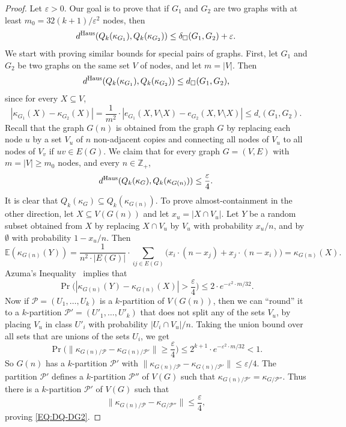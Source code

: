 \documentclass[10pt]{article}
\theoremstyle{plain}
\theoremstyle{definition}
\newcommand{\bbE}{\mathbb{E}}
\newcommand{\bbZ}{\mathbb{Z}}
\newcommand{\PP}{\mathcal{P}}
\newcommand{\eps}{\varepsilon}
\newcommand{\Haus}{{\text{\rm Haus}}}
\begin{document}
\begin{proof}
Let $\eps>0$. Our goal is to prove that if $G_1$ and $G_2$ are two graphs with
at least $m_0 =32(k+1)/\eps^2$ nodes, then
\begin{equation}\label{EQ:DQ-DG0}
d^\Haus(Q_k(\kappa_{G_1}), Q_k(\kappa_{G_2}))\le \delta_\square(G_1,G_2)+\eps.
\end{equation}
We start with proving similar bounds for special pairs of graphs. First, let
$G_1$ and $G_2$ be two graphs on the same set $V$ of nodes, and let $m=|V|$.
Then
\begin{equation}\label{EQ:DQ-DG}
d^\Haus(Q_k(\kappa_{G_1}), Q_k(\kappa_{G_2}))\le d_\square(G_1,G_2),
\end{equation}
since for every $X\subseteq V$,
\[
|\kappa_{G_1}(X)-\kappa_{G_2}(X)|
= \frac1{m^2}\cdot|e_{G_1}(X,V\setminus X)-e_{G_2}(X,V\setminus X)|\le d_\square(G_1,G_2).
\]
Recall that the graph $G(n)$ is obtained from the graph $G$ by replacing each node $u$
by a set $V_u$ of $n$ non-adjacent copies and connecting all nodes of $V_u$ to all nodes of $V_v$ if $uv \in E(G)$. 
We claim that for every graph $G=(V,E)$ with $m=|V|\geq m_0$ nodes, and every $n\in\bbZ_+$,
\begin{equation}\label{EQ:DQ-DG2}
d^\Haus(Q_k(\kappa_{G}), Q_k(\kappa_{G(n)}))\le\frac{\eps}{4}.
\end{equation}
It is clear that $Q_k(\kappa_G)\subseteq Q_k(\kappa_{G(n)})$. To prove
almost-containment in the other direction, let $X\subseteq V(G(n))$ and let
$x_u=|X\cap V_u|$. Let $Y$ be a random subset obtained from $X$ by replacing
$X\cap V_u$ by $V_u$ with probability $x_u/n$, and by $\emptyset$ with
probability $1-x_u/n$. Then 
\[
\bbE(\kappa_{G(n)}(Y)) = \frac1{n^2\cdot|E(G)|} \cdot\sum_{ij\in E(G)}\big(x_i\cdot(n-x_j)+x_j\cdot(n-x_i)\big) = \kappa_{G(n)}(X).
\]
Azuma's Inequality~\cite{azuma1967weighted} implies that
\[
\Pr\Big(|\kappa_{G(n)}(Y)-\kappa_{G(n)}(X)|> \frac{\eps}{4} \Big) \le 2\cdot e^{-\eps^2\cdot m/32}.
\]
Now if $\PP=(U_1,\dots,U_k)$ is a $k$-partition of $V(G(n))$, then we can
``round'' it to a $k$-partition $\PP'=(U'_1,\dots,U'_k)$ that does not split
any of the sets $V_u$, by placing $V_u$ in class $U'_i$ with probability
$|U_i\cap V_u|/n$. Taking the union bound over all sets that are unions of the
sets $U_i$, we get
\[
\Pr\Big(\|\kappa_{G(n)/\PP}-\kappa_{G(n)/\PP'}\| \ge \frac{\eps}{4}\Big)\le  2^{k+1}\cdot e^{-\eps^2\cdot m/32}<1.
\]
So $G(n)$ has a $k$-partition $\PP'$ with
$\|\kappa_{G(n)/\PP}-\kappa_{G(n)/\PP'}\| \le \eps/4$. The partition $\PP'$
defines a $k$-partition $\PP''$ of $V(G)$ such that
$\kappa_{G(n)/\PP'}=\kappa_{G/\PP''}$. Thus there is a $k$-partition $\PP'$ of
$V(G)$ such that
\[
\|\kappa_{G(n)/\PP}-\kappa_{G/\PP''}\|\le\frac{\eps}{4},
\]
proving \eqref{EQ:DQ-DG2}.


\end{proof}
\end{document}
